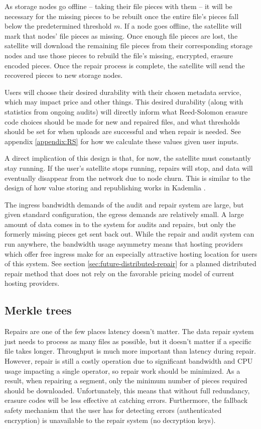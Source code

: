 \documentclass[11pt,fleqn,openany]{book}
\begin{document}
As storage nodes go offline -- taking their file pieces with them -- it will
be necessary for the missing pieces to be rebuilt once the entire file's pieces
fall below the predetermined threshold $m$. If a node goes offline, the
satellite will mark that nodes' file pieces as missing.
Once enough file pieces are lost, the satellite will download the
remaining file pieces from their corresponding storage nodes and use those
pieces
to rebuild the file's missing, encrypted, erasure encoded pieces.
Once the repair process is complete, the satellite will send the
recovered pieces to new storage nodes.

Users will choose their desired durability with their chosen metadata service,
which may impact price and other things. This desired durability (along with 
statistics from ongoing audits) will directly inform what Reed-Solomon erasure
code choices should be made for new and repaired files, and what thresholds
should be set for when uploads are successful and when repair is needed. See
appendix \ref{appendix:RS} for how we calculate these values given user inputs.

A direct implication of this design is that, for now, the satellite must
constantly stay running. If the user's satellite stops running, repairs will
stop, and data will eventually disappear from the network due to node churn.
This is similar to the design of how value storing and republishing works in
Kademlia \cite{kad}.

The ingress bandwidth demands of the audit and repair system are large, but
given standard configuration, the egress demands are relatively small.
A large amount of data comes in to the system for audits and repairs, but only
the formerly missing pieces get sent back out.
While the repair and audit system can run anywhere, the bandwidth usage
asymmetry means that hosting providers which offer free ingress
make for an especially attractive hosting location for users of this system.
See section \ref{sec:future-distributed-repair} for a planned distributed
repair method that
does not rely on the favorable pricing model of current hosting providers.

\subsection{Merkle trees}

Repairs are one of the few places latency doesn't matter. The data repair system
just needs to process as many files as possible, but it doesn't matter if
a specific file takes longer. Throughput is much more important than
latency during repair. However, repair
is still a costly operation due to significant bandwidth and CPU usage
impacting a single operator, so repair work should be minimized.
As a result, when repairing a segment,
only the minimum number of pieces required should be downloaded.
Unfortunately, this means that
without full redundancy, erasure codes will be less effective at catching
errors. Furthermore, the fallback safety mechanism that the user has for detecting
errors (authenticated encryption) is unavailable to the repair system (no
decryption keys).
\end{document}
